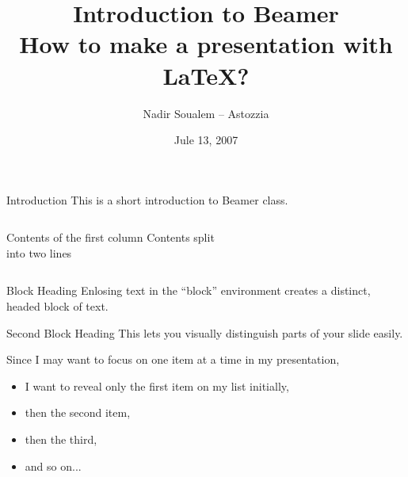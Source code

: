 \documentclass{beamer}
\title[Make a LaTeX presentation using Beamer]{Introduction  to Beamer\\How to make a presentation with LaTeX?}
\author{Nadir Soualem -- Astozzia}
\institute{Math-linux.com}
\date{Jule 13, 2007}
\begin{document}
\begin{frame}
  \titlepage
\end{frame}

\begin{frame}{Introduction}
  This is a short introduction to Beamer class.
\end{frame}

\begin{frame}
  \begin{columns}[c] %
    Contents of the first column
    Contents split \\ into two lines
  \end{columns}
\end{frame}


\begin{frame}
  \begin{block}{Block Heading}
    Enlosing text in the ``block'' environment creates a distinct, headed block of text.
  \end{block}
  \begin{block}{Second Block Heading}
    This lets you visually distinguish parts of your slide easily.
  \end{block}
\end{frame}


\begin{frame}
  Since I may want to focus on one item at a time in my presentation,
  \begin{itemize}
  \item I want to reveal only the first item on my list initially,
    \pause
  \item then the second item,
    \pause
  \item then the third,
    \pause
  \item and so on...
  \end{itemize}
\end{frame}
\end{document}
